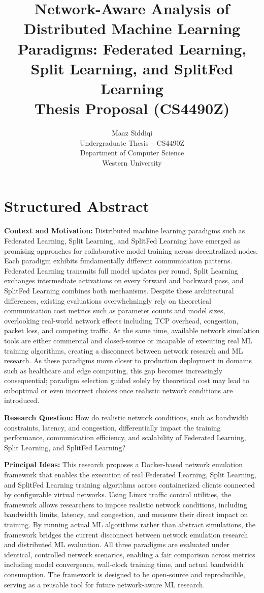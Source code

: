 \documentclass[12pt]{article}
\title{\textbf{Network-Aware Analysis of Distributed Machine Learning Paradigms: Federated Learning, Split Learning, and SplitFed Learning}\\[0.5em]
\large Thesis Proposal (CS4490Z)
}
\author{
Maaz Siddiqi\\
Undergraduate Thesis -- CS4490Z\\
Department of Computer Science\\
Western University
}
\date{}
\begin{document}
\maketitle

\section{Structured Abstract}

\textbf{Context and Motivation:} Distributed machine learning paradigms such as Federated Learning, Split Learning, and SplitFed Learning have emerged as promising approaches for collaborative model training across decentralized nodes. Each paradigm exhibits fundamentally different communication patterns. Federated Learning transmits full model updates per round, Split Learning exchanges intermediate activations on every forward and backward pass, and SplitFed Learning combines both mechanisms. Despite these architectural differences, existing evaluations overwhelmingly rely on theoretical communication cost metrics such as parameter counts and model sizes, overlooking real-world network effects including TCP overhead, congestion, packet loss, and competing traffic. At the same time, available network simulation tools are either commercial and closed-source or incapable of executing real ML training algorithms, creating a disconnect between network research and ML research. As these paradigms move closer to production deployment in domains such as healthcare and edge computing, this gap becomes increasingly consequential; paradigm selection guided solely by theoretical cost may lead to suboptimal or even incorrect choices once realistic network conditions are introduced.

\textbf{Research Question:} How do realistic network conditions, such as bandwidth constraints, latency, and congestion, differentially impact the training performance, communication efficiency, and scalability of Federated Learning, Split Learning, and SplitFed Learning?

\textbf{Principal Ideas:} This research proposes a Docker-based network emulation framework that enables the execution of real Federated Learning, Split Learning, and SplitFed Learning training algorithms across containerized clients connected by configurable virtual networks. Using Linux traffic control utilities, the framework allows researchers to impose realistic network conditions, including bandwidth limits, latency, and congestion, and measure their direct impact on training. By running actual ML algorithms rather than abstract simulations, the framework bridges the current disconnect between network emulation research and distributed ML evaluation. All three paradigms are evaluated under identical, controlled network scenarios, enabling a fair comparison across metrics including model convergence, wall-clock training time, and actual bandwidth consumption. The framework is designed to be open-source and reproducible, serving as a reusable tool for future network-aware ML research.
\end{document}
